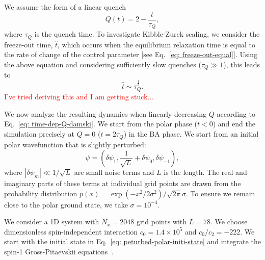 We assume the form of a linear quench
\begin{equation}
    Q(t) = 2 - \frac{t}{\tau_Q},
    \label{eq: time-dep-Q-damski}
\end{equation}
where $\tau_Q$ is the quench time.
To investigate Kibble-Zurek scaling, we consider the freeze-out time, $\hat{t}$,
which occurs when the equilibrium relaxation time is equal to the rate of change
of the control parameter [see Eq.~\eqref{eq: freeze-out-equal}].
Using the above equation and considering sufficiently slow quenches
($\tau_Q \gg 1$), this leads to
\begin{equation}
    \hat{t} \sim \tau_Q^{\frac{1}{3}}.
\end{equation}
\textcolor{red}{I've tried deriving this and I am getting stuck...}

We now analyze the resulting dynamics when linearly decreasing $Q$ according to
Eq.~\eqref{eq: time-dep-Q-damski}.
We start from the polar phase ($t < 0$) and end the simulation precisely at
$Q=0$ ($t=2\tau_Q$) in the BA phase.
We start from an initial polar wavefunction that is slightly perturbed:
\begin{equation}
    \psi = \left(\delta\psi_1, \frac{1}{\sqrt{L}} + \delta\psi_0,
    \delta\psi_{-1}\right),
    \label{eq: peturbed-polar-initi-state}
\end{equation}
where $|\delta\psi_m| \ll 1 / \sqrt{L}$ are small noise terms and $L$ is the
length.
The real and imaginary parts of these terms at individual grid points are drawn
from the probability distribution
$p(x) = \exp(-x^2/2\sigma^2)/\sqrt{2\pi}\sigma$.
To ensure we remain close to the polar ground state, we take $\sigma=10^{-4}$.

We consider a 1D system with $N_x = 2048$ grid points with $L=78$.
We choose dimensionless spin-independent interaction $c_0=1.4\times10^5$ and 
$c_0/c_2 = -222$.
We start with the initial state in Eq.~\eqref{eq: peturbed-polar-initi-state}
and integrate the spin-1 Gross-Pitaevskii equations~\cite{Symes2016}.

